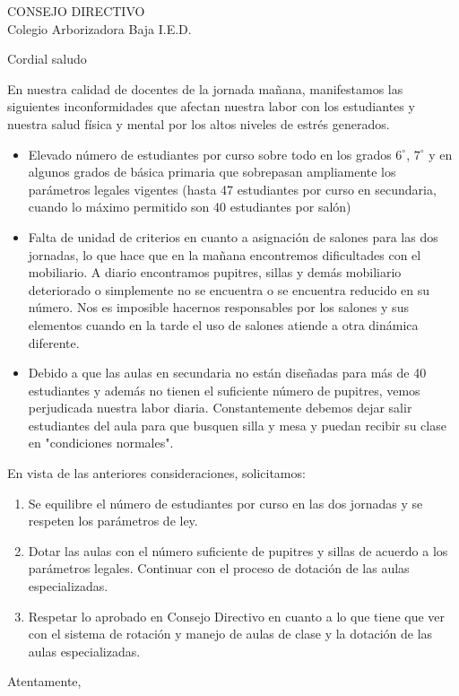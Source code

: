 \documentclass[letterpaper,spanish,11pt]{letter}
\date{26 de febrero de 2015}
\begin{document}
\begin{letter}{CONSEJO DIRECTIVO\\Colegio Arborizadora Baja I.E.D.}
	
\opening{Cordial saludo}
En nuestra calidad de docentes de la jornada mañana, manifestamos las siguientes inconformidades que afectan nuestra labor con los estudiantes y nuestra salud física y mental por los altos niveles de estr\'{e}s generados.
\begin{itemize}
\item Elevado n\'{u}mero de estudiantes por curso sobre todo en los grados $6^{\circ}$, $7^{\circ}$ y en algunos grados de básica primaria que sobrepasan ampliamente los par\'{a}metros legales vigentes (hasta 47 estudiantes por curso en secundaria, cuando lo m\'{a}ximo permitido son 40 estudiantes por sal\'{o}n)
\item Falta de unidad de criterios en cuanto a asignación de salones para las dos jornadas, lo que hace que en la mañana encontremos dificultades con el mobiliario. A diario encontramos pupitres, sillas y demás mobiliario deteriorado o simplemente no se encuentra o se encuentra reducido en su número. Nos es imposible hacernos responsables por los salones y sus elementos cuando en la tarde el uso de salones atiende a otra dinámica diferente.
\item Debido a que las aulas en secundaria no están diseñadas para más de 40 estudiantes y además no tienen el suficiente número de pupitres, vemos perjudicada nuestra labor diaria. Constantemente debemos dejar salir estudiantes del aula para que busquen silla y mesa y puedan recibir su clase en "condiciones normales".
\end{itemize}
En vista de las anteriores consideraciones, solicitamos: 
\begin{enumerate}
\item Se equilibre el número de estudiantes por curso en las dos jornadas y se respeten los parámetros de ley.
\item Dotar las aulas con el número suficiente de pupitres y sillas de acuerdo a los parámetros legales. Continuar con el proceso de dotación de las aulas especializadas.
\item Respetar lo aprobado en Consejo Directivo en cuanto a lo que tiene que ver con el sistema de rotación y manejo de aulas de clase y la dotación de las aulas especializadas.
\end{enumerate}

\closing{Atentamente,}


\end{letter}
\end{document}
